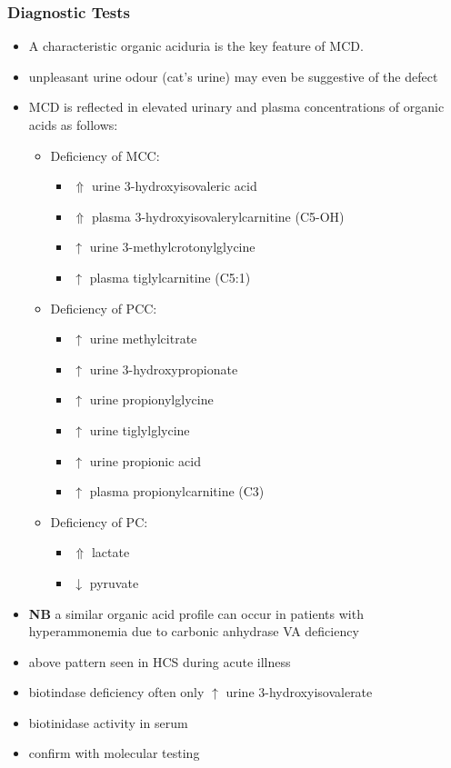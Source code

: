 \documentclass{scrartcl}
\begin{document}
\subsubsection{Diagnostic Tests}
\label{sec:org70d52a4}
\begin{itemize}
\item A characteristic organic aciduria is the key feature of MCD.
\item unpleasant urine odour (cat’s urine) may even be suggestive of the
defect
\item MCD is reflected in elevated urinary and plasma concentrations of
organic acids as follows:
\begin{itemize}
\item Deficiency of MCC:
\begin{itemize}
\item \(\Uparrow\) urine 3-hydroxyisovaleric acid
\item \(\Uparrow\) plasma 3-hydroxyisovalerylcarnitine (C5-OH)
\item \(\uparrow\) urine 3-methylcrotonylglycine
\item \(\uparrow\) plasma tiglylcarnitine (C5:1)
\end{itemize}
\item Deficiency of PCC:
\begin{itemize}
\item \(\uparrow\) urine methylcitrate
\item \(\uparrow\) urine 3-hydroxypropionate
\item \(\uparrow\) urine propionylglycine
\item \(\uparrow\) urine tiglylglycine
\item \(\uparrow\) urine propionic acid
\item \(\uparrow\) plasma propionylcarnitine (C3)
\end{itemize}
\item Deficiency of PC:
\begin{itemize}
\item \(\Uparrow\) lactate
\item \(\downarrow\) pyruvate
\end{itemize}
\end{itemize}
\item \textbf{NB} a similar organic acid profile can occur in patients with
hyperammonemia due to carbonic anhydrase VA deficiency

\item above pattern seen in HCS during acute illness
\item biotindase deficiency often only \(\uparrow\) urine 3-hydroxyisovalerate
\item biotinidase activity in serum
\item confirm with molecular testing
\end{itemize}
\end{document}
